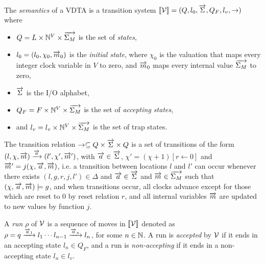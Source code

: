 \begin{definition}
	\label{def:vdta:semantics}
	The {\em semantics} of a \ac{VDTA} is a transition system $[\![{\mathcal V}]\!]=(Q, l_0, \overrightarrow{\Sigma}, Q_F, l_v, \to)$ where
	\begin{itemize}
		\item $Q= L \times \mathbb{N}^V \times \overrightarrow{\Sigma_M}$ is the set of {\em states},
		\item $l_0=(l_0, \chi_0, \overrightarrow{m}_0)$ is the {\em initial state}, where $\chi_0$ is the
		valuation that maps every integer clock variable in $V$ to zero, and $\overrightarrow{m}_0$ maps every internal value $\overrightarrow{\Sigma_M}$ to zero,
		\item $\overrightarrow{\Sigma}$ is the I/O alphabet,
		\item $Q_F= F \times \mathbb{N}^V \times \overrightarrow{\Sigma_M}$ is the set of {\em accepting states},
		\item and $l_v = l_v\times\mathbb{N}^V \times \overrightarrow{\Sigma_M}$ is the set of trap states.
	\end{itemize}
	The transition relation $\to \subseteq Q\times \overrightarrow{\Sigma} \times Q$ is a set of transitions of the form
	$(l,\chi,\overrightarrow{m})\xrightarrow{\overrightarrow{a}}(l',\chi',\overrightarrow{m}')$, with $\overrightarrow{a} \in \overrightarrow{\Sigma}$, $\chi'=(\chi+1)[r \leftarrow 0]$ and $\overrightarrow{m}' = j(\chi, \overrightarrow{a}, \overrightarrow{m})$, i.e. a transition between locations $l$ and $l'$ can occur whenever there exists $(l, g, r, j, l') \in \Delta$ and $\overrightarrow{a} \in \overrightarrow{\Sigma}$ and $\overrightarrow{m} \in \overrightarrow{\Sigma_M}$ such that $(\chi, \overrightarrow{a}, \overrightarrow{m}) \models g$, and when transitions occur, all clocks advance except for those which are reset to 0 by reset relation $r$, and all internal variables $\overrightarrow{m}$ are updated to new values by function $j$. 
\end{definition}

A {\em run} $\rho$ of ${\mathcal V}$ is a sequence of moves in $[\![{\mathcal V}]\!]$ denoted as $\rho = q \xrightarrow {\overrightarrow{a}_1} l_1\cdots l_{n-1}\xrightarrow {\overrightarrow{a}_n} l_{n}$, for some $n\in\mathbb{N}$. %
A run is \textit{accepted} by ${\mathcal V}$ if it ends in an accepting state $l_n \in Q_F$, and a run is \textit{non-accepting} if it ends in a non-accepting state $l_n \in l_v$.


